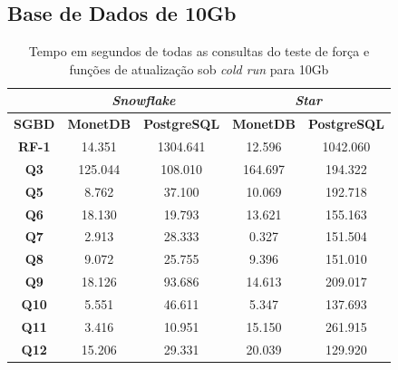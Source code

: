 
\subsection{Base de Dados de 10Gb}

\begin{table}[htpb]
        \centering
        \caption{Tempo em segundos de todas as consultas do teste de força e funções de atualização sob \textit{cold run} para 10Gb}
        \label{tab:queries_cold_10}
        \begin{tabular}{|c|c|c|c|c|}
        \hline
                & \multicolumn{2}{c|}{\textit{\textbf{Snowflake}}} & \multicolumn{2}{c|}{\textit{\textbf{Star}}} \\ \hline
        \textbf{SGBD}  & \textbf{MonetDB}      & \textbf{PostgreSQL}      & \textbf{MonetDB}    & \textbf{PostgreSQL}   \\ \hline
        \textbf{RF-1}  & 14.351                & 1304.641                 & 12.596              & 1042.060              \\ \hline
        \textbf{Q3}    & 125.044               & 108.010                  & 164.697             & 194.322               \\ \hline
        \textbf{Q5}    & 8.762                 & 37.100                   & 10.069              & 192.718               \\ \hline
        \textbf{Q6}    & 18.130                & 19.793                   & 13.621              & 155.163               \\ \hline
        \textbf{Q7}    & 2.913                 & 28.333                   & 0.327               & 151.504               \\ \hline
        \textbf{Q8}    & 9.072                 & 25.755                   & 9.396               & 151.010               \\ \hline
        \textbf{Q9}    & 18.126                & 93.686                   & 14.613              & 209.017               \\ \hline
        \textbf{Q10}   & 5.551                 & 46.611                   & 5.347               & 137.693               \\ \hline
        \textbf{Q11}   & 3.416                 & 10.951                   & 15.150              & 261.915               \\ \hline
        \textbf{Q12}   & 15.206                & 29.331                   & 20.039              & 129.920               \\ \hline

\end{tabular}
\end{table}
